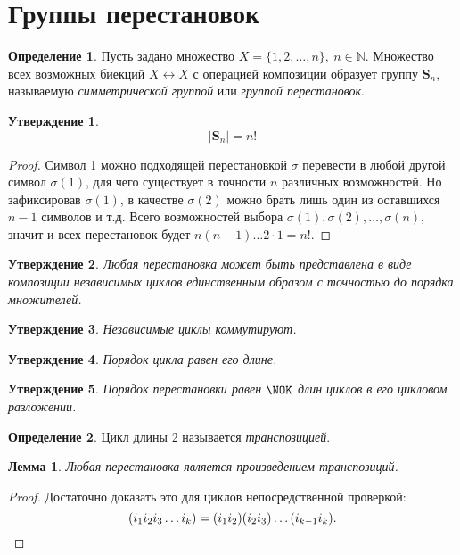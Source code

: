 \documentclass[a4paper, 14pt]{extarticle}
\newcommand{\naturals}{\mathbb{N}}
\newcommand{\symmetrical}{\mathbf{S}}
\theoremstyle{definition}
\newtheorem{definition}{Определение}
\theoremstyle{plain}
\numberwithin{theorem}{section}
\numberwithin{definition}{section}
\newtheorem{statement}{Утверждение}
\numberwithin{statement}{section}
\newtheorem{lemma}{Лемма}
\numberwithin{lemma}{section}
\numberwithin{consequence}{section}
\begin{document}
	\section{Группы перестановок}
	\setcounter{definition}{0}
	\begin{definition}
		Пусть задано множество ${X = \{1, 2, \ldots, n\}, \ n \in \naturals}$. Множество всех возможных биекций ${X \leftrightarrow X}$ с операцией композиции образует группу $\symmetrical_n$, называемую \textit{симметрической группой} или \textit{группой перестановок}.
	\end{definition}
	\begin{statement}
		\begin{equation*}
			|\symmetrical_n| = n!
		\end{equation*}
	\end{statement}
	\begin{proof}
		Символ 1 можно подходящей перестановкой $\sigma$ перевести в любой другой символ ${\sigma(1)}$, для чего существует в точности $n$ различных возможностей. Но зафиксировав ${\sigma(1)}$, в качестве ${\sigma(2)}$ можно брать лишь один из оставшихся ${n - 1}$ символов и т.д. Всего возможностей выбора ${\sigma(1), \sigma(2), \ldots, \sigma(n)}$, значит и всех перестановок будет ${n(n - 1) \ldots 2 \cdot 1 = n!.}$
	\end{proof}
	\begin{statement}
		Любая перестановка может быть представлена в виде композиции независимых циклов единственным образом с точностью до порядка множителей.
	\end{statement}
	\begin{statement}
		Независимые циклы коммутируют.
	\end{statement}
        \begin{statement}
		Порядок цикла равен его длине.
	\end{statement}
	\begin{statement}
		Порядок перестановки равен $\NOK$ длин циклов в его цикловом разложении.
	\end{statement}
        \begin{definition}
		Цикл длины 2 называется \textit{транспозицией}.
	\end{definition}
	\begin{lemma}
		Любая перестановка является произведением транспозиций.
	\end{lemma}
        \begin{proof}
            Достаточно доказать это для циклов непосредственной проверкой:
            \begin{equation*}
                (i_1 i_2 i_3 \ldots i_k) = (i_1 i_2)(i_2 i_3)\ldots(i_{k-1} i_k). \qedhere
            \end{equation*}
        \end{proof}
\end{document}
